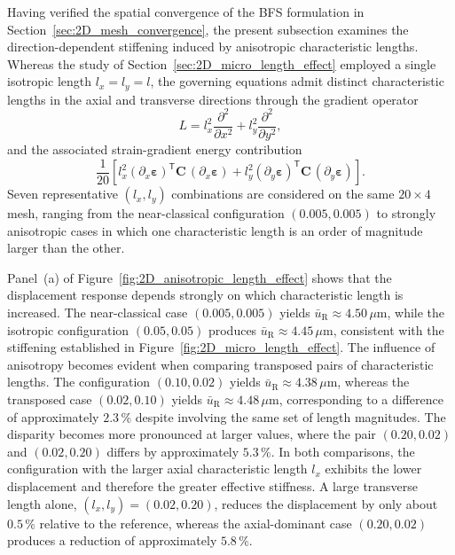 \documentclass[final,3p,times,fleqn]{elsarticle}
\begin{document}
Having verified the spatial convergence of the BFS formulation in
Section~\ref{sec:2D_mesh_convergence}, the present subsection examines
the direction-dependent stiffening induced by anisotropic characteristic
lengths.
Whereas the study of Section~\ref{sec:2D_micro_length_effect} employed
a single isotropic length $l_{x}=l_{y}=l$, the governing equations
admit distinct characteristic lengths in the axial and transverse
directions through the gradient operator
\begin{equation*}
L=l_{x}^{2}\frac{\partial^{2}}{\partial x^{2}}
 +l_{y}^{2}\frac{\partial^{2}}{\partial y^{2}},
\end{equation*}
and the associated strain-gradient energy contribution
\begin{equation*}
\frac{1}{20}\!\left[
l_{x}^{2}
(\partial_{x}\boldsymbol{\varepsilon})^{\mathsf T}
\mathbf C\,(\partial_{x}\boldsymbol{\varepsilon})
+
l_{y}^{2}
(\partial_{y}\boldsymbol{\varepsilon})^{\mathsf T}
\mathbf C\,(\partial_{y}\boldsymbol{\varepsilon})
\right].
\end{equation*}
Seven representative $(l_{x},l_{y})$ combinations are considered on the
same $20\times4$ mesh, ranging from the near-classical configuration
$(0.005,0.005)$ to strongly anisotropic cases in which one
characteristic length is an order of magnitude larger than the other.

Panel~(a) of Figure~\ref{fig:2D_anisotropic_length_effect} shows that
the displacement response depends strongly on which characteristic
length is increased.
The near-classical case $(0.005,0.005)$ yields
$\bar{u}_{\mathrm{R}}\approx 4.50\,\mu\mathrm{m}$, while the isotropic
configuration $(0.05,0.05)$ produces
$\bar{u}_{\mathrm{R}}\approx 4.45\,\mu\mathrm{m}$, consistent with the
stiffening established in
Figure~\ref{fig:2D_micro_length_effect}.
The influence of anisotropy becomes evident when comparing transposed
pairs of characteristic lengths.
The configuration $(0.10,0.02)$ yields
$\bar{u}_{\mathrm{R}}\approx 4.38\,\mu\mathrm{m}$, whereas the
transposed case $(0.02,0.10)$ yields
$\bar{u}_{\mathrm{R}}\approx 4.48\,\mu\mathrm{m}$, corresponding to a
difference of approximately $2.3\,\%$ despite involving the same set
of length magnitudes.
The disparity becomes more pronounced at larger values, where the
pair $(0.20,0.02)$ and $(0.02,0.20)$ differs by approximately
$5.3\,\%$.
In both comparisons, the configuration with the larger axial
characteristic length $l_{x}$ exhibits the lower displacement and
therefore the greater effective stiffness.
A large transverse length alone, $(l_{x},l_{y})=(0.02,0.20)$, reduces
the displacement by only about $0.5\,\%$ relative to the reference,
whereas the axial-dominant case $(0.20,0.02)$ produces a reduction of
approximately $5.8\,\%$.
\end{document}
